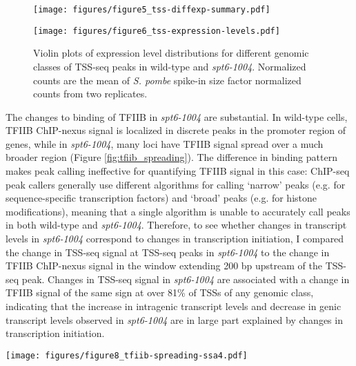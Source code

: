 \documentclass[10pt, letterpaper]{article}
\begin{document}
\begin{figure}[h]
    \centering
    \begin{minipage}[t]{8.5cm}
        \centering
        \texttt{[image: figures/figure5\_tss-diffexp-summary.pdf]}
        \caption{Top) Diagram of different genomic classes of TSSs. Bottom) Bar plot showing the number of TSS-seq peaks differentially expressed in \textit{spt6-1004} versus wild-type.}
        \label{fig:tss_diffexp_summary}
    \end{minipage}\hfill
    \begin{minipage}[t]{8.5cm}
        \centering
        \texttt{[image: figures/figure6\_tss-expression-levels.pdf]}
        \caption{Violin plots of expression level distributions for different genomic classes of TSS-seq peaks in wild-type and \textit{spt6-1004}. Normalized counts are the mean of \textit{S. pombe} spike-in size factor normalized counts from two replicates.}
        \label{fig:tss_expression_levels}
    \end{minipage}
\end{figure}

The changes to binding of TFIIB in \textit{spt6-1004} are substantial. In wild-type cells, TFIIB ChIP-nexus signal is localized in discrete peaks in the promoter region of genes, while in \textit{spt6-1004}, many loci have TFIIB signal spread over a much broader region (Figure \ref{fig:tfiib_spreading}). The difference in binding pattern makes peak calling ineffective for quantifying TFIIB signal in this case: ChIP-seq peak callers generally use different algorithms for calling `narrow' peaks (e.g. for sequence-specific transcription factors) and `broad' peaks (e.g. for histone modifications), meaning that a single algorithm is unable to accurately call peaks in both wild-type and \textit{spt6-1004}. Therefore, to see whether changes in transcript levels in \textit{spt6-1004} correspond to changes in transcription initiation, I compared the change in TSS-seq signal at TSS-seq peaks in \textit{spt6-1004} to the change in TFIIB ChIP-nexus signal in the window extending 200 bp upstream of the TSS-seq peak. Changes in TSS-seq signal in \textit{spt6-1004} are associated with a change in TFIIB signal of the same sign at over 81\% of TSSs of any genomic class, indicating that the increase in intragenic transcript levels and decrease in genic transcript levels observed in \textit{spt6-1004} are in large part explained by changes in transcription initiation.

\begin{SCfigure}[50][h]
\centering
\texttt{[image: figures/figure8\_tfiib-spreading-ssa4.pdf]}
\caption{Top) TFIIB ChIP-nexus protection in wild-type and \textit{spt6-1004} strains over 20 kb of chromosome II flanking the \textit{SSA4} gene. Bottom) Expanded view of TFIIB protection over the \textit{SSA4} gene.}
\label{fig:tfiib_spreading}
\end{SCfigure}
\end{document}
